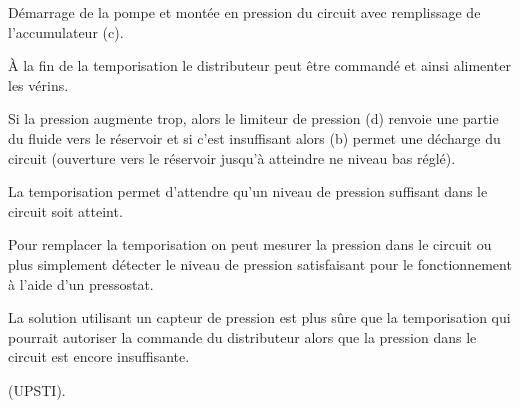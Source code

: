 \begin{corrigebox}
Démarrage de la pompe et montée en pression du circuit avec remplissage de l’accumulateur (c).

À la fin de la temporisation le distributeur peut être commandé et ainsi alimenter les vérins.

Si la pression augmente trop, alors le limiteur de pression (d) renvoie une partie du fluide vers le
réservoir et si c’est insuffisant alors (b) permet une décharge du circuit (ouverture vers le réservoir
jusqu’à atteindre ne niveau bas réglé).

La temporisation permet d’attendre qu’un niveau de pression suffisant dans le circuit soit atteint.

Pour remplacer la temporisation on peut mesurer la pression dans le circuit ou plus simplement détecter
le niveau de pression satisfaisant pour le fonctionnement à l’aide d’un pressostat.

La solution utilisant un capteur de pression est plus sûre que la temporisation qui pourrait autoriser la
commande du distributeur alors que la pression dans le circuit est encore insuffisante.

(UPSTI).
\end{corrigebox}
